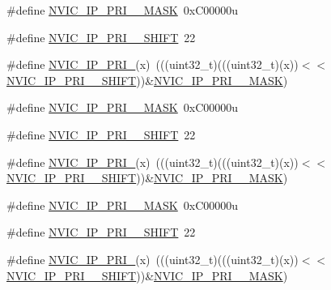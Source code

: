 \begin{DoxyCompactItemize}
\item 
\#define \hyperlink{group___n_v_i_c___register___masks_ga6be8bfca245e377fed6f71e809698c82}{N\+V\+I\+C\+\_\+\+I\+P\+\_\+\+P\+R\+I\+\_\+\_\+\+M\+A\+SK}~0x\+C00000u
\item 
\#define \hyperlink{group___n_v_i_c___register___masks_ga95bad88287c49846044bc97959a7d7a3}{N\+V\+I\+C\+\_\+\+I\+P\+\_\+\+P\+R\+I\+\_\+\_\+\+S\+H\+I\+FT}~22
\item 
\#define \hyperlink{group___n_v_i_c___register___masks_ga22e235287a8d0ab41a3cc31952db86c0}{N\+V\+I\+C\+\_\+\+I\+P\+\_\+\+P\+R\+I\+\_}(x)~(((uint32\+\_\+t)(((uint32\+\_\+t)(x))$<$$<$\hyperlink{group___n_v_i_c___register___masks_ga95bad88287c49846044bc97959a7d7a3}{N\+V\+I\+C\+\_\+\+I\+P\+\_\+\+P\+R\+I\+\_\+\_\+\+S\+H\+I\+FT}))\&\hyperlink{group___n_v_i_c___register___masks_ga6be8bfca245e377fed6f71e809698c82}{N\+V\+I\+C\+\_\+\+I\+P\+\_\+\+P\+R\+I\+\_\+\_\+\+M\+A\+SK})
\item 
\#define \hyperlink{group___n_v_i_c___register___masks_ga713bbc46d505c895fc20c8b0ea74f8dd}{N\+V\+I\+C\+\_\+\+I\+P\+\_\+\+P\+R\+I\+\_\+\_\+\+M\+A\+SK}~0x\+C00000u
\item 
\#define \hyperlink{group___n_v_i_c___register___masks_ga18e47397c19f9f734a16ab82ab12a5a1}{N\+V\+I\+C\+\_\+\+I\+P\+\_\+\+P\+R\+I\+\_\+\_\+\+S\+H\+I\+FT}~22
\item 
\#define \hyperlink{group___n_v_i_c___register___masks_ga2dd1856080ade3eaf847fdf4af612aea}{N\+V\+I\+C\+\_\+\+I\+P\+\_\+\+P\+R\+I\+\_}(x)~(((uint32\+\_\+t)(((uint32\+\_\+t)(x))$<$$<$\hyperlink{group___n_v_i_c___register___masks_ga18e47397c19f9f734a16ab82ab12a5a1}{N\+V\+I\+C\+\_\+\+I\+P\+\_\+\+P\+R\+I\+\_\+\_\+\+S\+H\+I\+FT}))\&\hyperlink{group___n_v_i_c___register___masks_ga713bbc46d505c895fc20c8b0ea74f8dd}{N\+V\+I\+C\+\_\+\+I\+P\+\_\+\+P\+R\+I\+\_\+\_\+\+M\+A\+SK})
\item 
\#define \hyperlink{group___n_v_i_c___register___masks_ga49a77ec05b40887c0ddc3ce4e47b72a8}{N\+V\+I\+C\+\_\+\+I\+P\+\_\+\+P\+R\+I\+\_\+\_\+\+M\+A\+SK}~0x\+C00000u
\item 
\#define \hyperlink{group___n_v_i_c___register___masks_ga07ca207cbc1ff96a08afe00a45264736}{N\+V\+I\+C\+\_\+\+I\+P\+\_\+\+P\+R\+I\+\_\+\_\+\+S\+H\+I\+FT}~22
\item 
\#define \hyperlink{group___n_v_i_c___register___masks_ga07f74f343ce561e9caf4106b285f7927}{N\+V\+I\+C\+\_\+\+I\+P\+\_\+\+P\+R\+I\+\_}(x)~(((uint32\+\_\+t)(((uint32\+\_\+t)(x))$<$$<$\hyperlink{group___n_v_i_c___register___masks_ga07ca207cbc1ff96a08afe00a45264736}{N\+V\+I\+C\+\_\+\+I\+P\+\_\+\+P\+R\+I\+\_\+\_\+\+S\+H\+I\+FT}))\&\hyperlink{group___n_v_i_c___register___masks_ga49a77ec05b40887c0ddc3ce4e47b72a8}{N\+V\+I\+C\+\_\+\+I\+P\+\_\+\+P\+R\+I\+\_\+\_\+\+M\+A\+SK})
$$
\end{DoxyCompactItemize}
